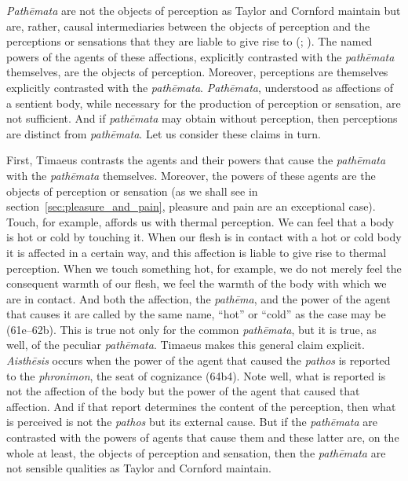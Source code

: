 \emph{Pathēmata} are not the objects of perception as Taylor and Cornford maintain but are, rather, causal intermediaries between the objects of perception and the perceptions or sensations that they are liable to give rise to (\citealt[138]{OBrien:1984ji}; \citealt{Brisson:1997qr}). The named powers of the agents of these affections, explicitly contrasted with the \emph{pathēmata} themselves, are the objects of perception. Moreover, perceptions are themselves explicitly contrasted with the \emph{pathēmata}. \emph{Pathēmata}, understood as affections of a sentient body, while necessary for the production of perception or sensation, are not sufficient. And if \emph{pathēmata} may obtain without perception, then perceptions are distinct from \emph{pathēmata}. Let us consider these claims in turn.

First, Timaeus contrasts the agents and their powers that cause the \emph{pathēmata} with the \emph{pathēmata} themselves. Moreover, the powers of these agents are the objects of perception or sensation (as we shall see in section~\ref{sec:pleasure_and_pain}, pleasure and pain are an exceptional case). Touch, for example, affords us with thermal perception. We can feel that a body is hot or cold by touching it. When our flesh is in contact with a hot or cold body it is affected in a certain way, and this affection is liable to give rise to thermal perception. When we touch something hot, for example, we do not merely feel the consequent warmth of our flesh, we feel the warmth of the body with which we are in contact. And both the affection, the \emph{pathēma}, and the power of the agent that causes it are called by the same name, ``hot'' or ``cold'' as the case may be (61e--62b). This is true not only for the common \emph{pathēmata}, but it is true, as well, of the peculiar \emph{pathēmata}. Timaeus makes this general claim explicit. \emph{Aisthēsis} occurs when the power of the agent that caused the \emph{pathos} is reported to the \emph{phronimon}, the seat of cognizance (64b4). Note well, what is reported is not the affection of the body but the power of the agent that caused that affection. And if that report determines the content of the perception, then what is perceived is not the \emph{pathos} but its external cause. But if the \emph{pathēmata} are contrasted with the powers of agents that cause them and these latter are, on the whole at least, the objects of perception and sensation, then the \emph{pathēmata} are not sensible qualities as Taylor and Cornford maintain.

